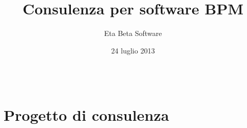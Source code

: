 \documentclass[compress,9pt]{beamer}
\title{Consulenza per software BPM}
\author{Eta Beta Software}
\date{24 luglio 2013}
\begin{document}
\begin{frame}
\maketitle
\end{frame}

\begin{frame}
\begin{columns}
\end{columns}
\end{frame}

\section{Progetto di consulenza}
\end{document}
